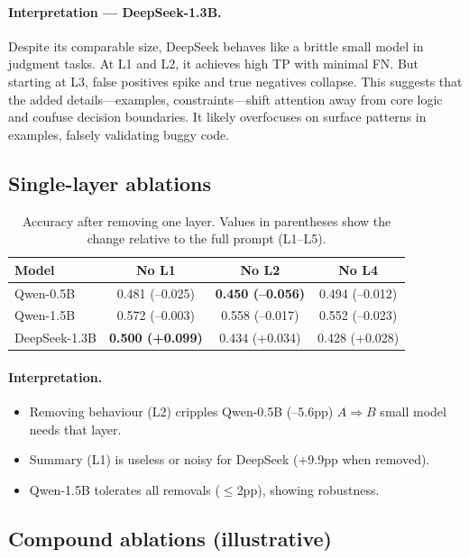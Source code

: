 \documentclass[a4paper]{usiinfbachelorproject}
\begin{document}
\paragraph*{Interpretation — DeepSeek-1.3B.}
Despite its comparable size, DeepSeek behaves like a brittle small model in judgment tasks. At L1 and L2, it achieves high TP with minimal FN. But starting at L3, false positives spike and true negatives collapse. This suggests that the added details—examples, constraints—shift attention away from core logic and confuse decision boundaries. It likely overfocuses on surface patterns in examples, falsely validating buggy code.



\subsection{Single-layer ablations}

\begin{table}[H]\centering
\caption{Accuracy after removing one layer. Values in parentheses show the change relative to the full prompt (L1--L5).}
\begin{tabular}{lccc}
\toprule
\textbf{Model} & \textbf{No L1} & \textbf{No L2} & \textbf{No L4} \\ \midrule
Qwen-0.5B  & 0.481 (–0.025) & \textbf{0.450 (–0.056)} & 0.494 (–0.012) \\
Qwen-1.5B  & 0.572 (–0.003) & 0.558 (–0.017) & 0.552 (–0.023) \\
DeepSeek-1.3B & \textbf{0.500 (+0.099)} & 0.434 (+0.034) & 0.428 (+0.028) \\
\bottomrule
\end{tabular}
\end{table}

\paragraph*{Interpretation.}
\begin{itemize}[leftmargin=12pt,itemsep=0pt]
  \item Removing behaviour (L2) cripples Qwen-0.5B (–5.6pp) $A \Rightarrow B$
 small model needs that layer.  
  \item Summary (L1) is useless or noisy for DeepSeek (+9.9pp when removed).  
  \item Qwen-1.5B tolerates all removals ($\leq$2pp), showing robustness.
\end{itemize}

\subsection{Compound ablations (illustrative)}
\end{document}

